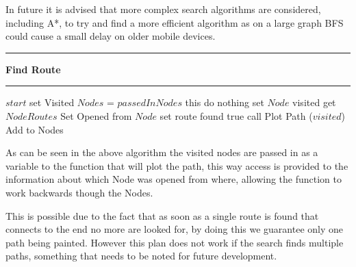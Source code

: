 In future it is advised that more complex search algorithms are considered, including A*\cite{astar}, to try and find a more efficient algorithm as on a large graph BFS could cause a small delay on older mobile devices. 
\vspace{0.3cm}
\hrule
\vspace{0.1cm}
\textbf{Find Route}
\vspace{0.1cm}
\hrule
\vspace{0.1cm}
\begin{algorithmic}[1]
\State $start$ set Visited
\State $Nodes$ = $passedInNodes$
 this
    \State do nothing
\Else
	\State set $Node$ visited
    \State get $Node Routes$
    \State Set Opened from $Node$
    		\State set route found true
    		\State call Plot Path ($visited$)
    	\EndIf
    		\State Add to Nodes
    	\EndIf
    \EndFor
\EndIf
\EndFor
\EndWhile
\end{algorithmic}

As can be seen in the above algorithm the visited nodes are passed in as a variable to the function that will plot the path, this way access is provided to the information about which Node was opened from where, allowing the function to work backwards though the Nodes.

This is possible due to the fact that as soon as a single route is found that connects to the end no more are looked for, by doing this we guarantee only one path being painted. However this plan does not work if the search finds multiple paths, something that needs to be noted for future development. 

